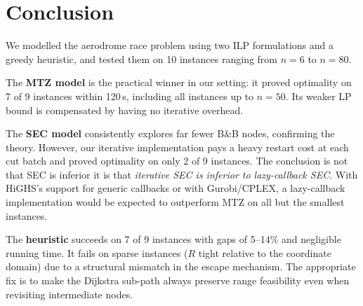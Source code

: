 \documentclass[12pt, a4paper]{article}
\begin{document}
\section{Conclusion}

We modelled the aerodrome race problem using two ILP formulations and a greedy
heuristic, and tested them on 10 instances ranging from $n = 6$ to $n = 80$.

The \textbf{MTZ model} is the practical winner in our setting: it proved optimality
on 7 of 9 instances within 120\,s, including all instances up to $n = 50$. Its
weaker LP bound is compensated by having no iterative overhead.

The \textbf{SEC model} consistently explores far fewer B\&B nodes, confirming the
theory. However, our iterative implementation pays a heavy restart cost at each cut
batch and proved optimality on only 2 of 9 instances. The conclusion is not that
SEC is inferior it is that \emph{iterative SEC is inferior to lazy-callback
SEC}. With HiGHS's support for generic callbacks or with Gurobi/CPLEX, a
lazy-callback implementation would be expected to outperform MTZ on all but the
smallest instances.

The \textbf{heuristic} succeeds on 7 of 9 instances with gaps of 5--14\% and
negligible running time. It fails on sparse instances ($R$ tight relative to the
coordinate domain) due to a structural mismatch in the escape mechanism. The
appropriate fix is to make the Dijkstra sub-path always preserve range feasibility
even when revisiting intermediate nodes.


\newpage



\end{document}
